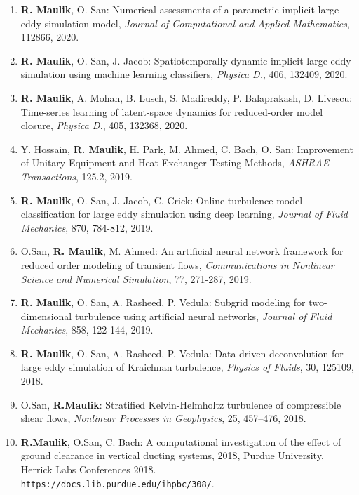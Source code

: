 \documentclass[letterpaper]{article}
\begin{document}
\begin{enumerate}
\item \textbf{R. Maulik}, O. San: Numerical assessments of a parametric implicit large eddy simulation model, {\it Journal of Computational and Applied Mathematics}, 112866, 2020.

\item \textbf{R. Maulik}, O. San, J. Jacob: Spatiotemporally dynamic implicit large eddy simulation using machine learning classifiers, {\it Physica D.}, 406, 132409, 2020.

\item \textbf{R. Maulik}, A. Mohan, B. Lusch, S. Madireddy, P. Balaprakash, D. Livescu: Time-series learning of latent-space dynamics for reduced-order model closure, {\it Physica D.}, 405, 132368, 2020.

\item Y. Hossain, \textbf{R. Maulik}, H. Park, M. Ahmed, C. Bach, O. San: Improvement of Unitary Equipment and Heat Exchanger Testing Methods, {\it ASHRAE Transactions}, 125.2, 2019.

\item \textbf{R. Maulik}, O. San, J. Jacob, C. Crick: Online turbulence model classification for large eddy simulation using deep learning, {\it Journal of Fluid Mechanics}, 870, 784-812, 2019.

\item O.San, \textbf{R. Maulik}, M. Ahmed: An artificial neural network framework for reduced order modeling of transient flows, {\it Communications in Nonlinear Science and Numerical Simulation}, 77, 271-287, 2019.

\item \textbf{R. Maulik}, O. San, A. Rasheed, P. Vedula: Subgrid modeling for two-dimensional turbulence using artificial neural networks, {\it Journal of Fluid Mechanics}, 858, 122-144, 2019.

\item \textbf{R. Maulik}, O. San, A. Rasheed, P. Vedula: Data-driven deconvolution for large eddy simulation of Kraichnan turbulence, {\it Physics of Fluids}, 30, 125109, 2018.

\item O.San, \textbf{R.Maulik}: Stratified Kelvin-Helmholtz turbulence of compressible shear flows, {\it Nonlinear Processes in Geophysics}, 25, 457--476, 2018.

\item \textbf{R.Maulik}, O.San, C. Bach: A computational investigation of the effect of ground clearance in vertical ducting systems, 2018, Purdue University, Herrick Labs Conferences 2018. \\ \texttt{https://docs.lib.purdue.edu/ihpbc/308/}.
 

\end{enumerate}
\end{document}
